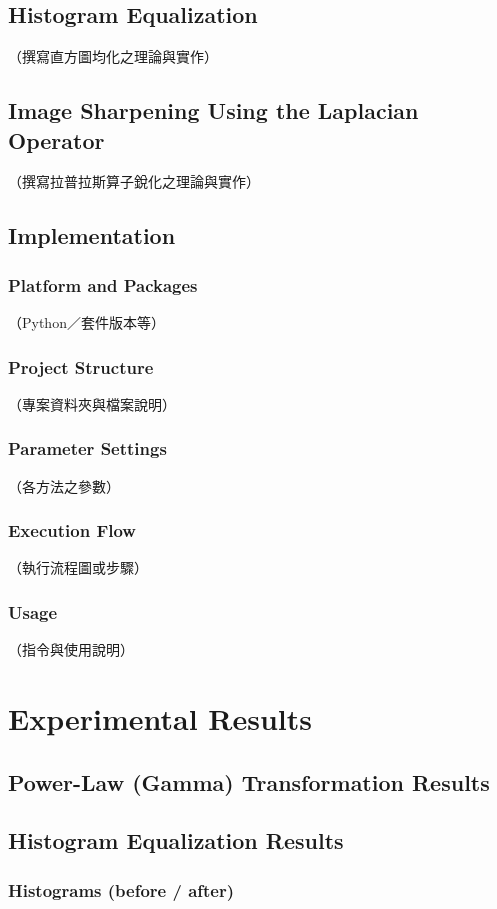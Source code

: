 \documentclass[12pt,a4paper]{article}
\begin{document}
\subsection{Histogram Equalization}
（撰寫直方圖均化之理論與實作）

\subsection{Image Sharpening Using the Laplacian Operator}
（撰寫拉普拉斯算子銳化之理論與實作）

\subsection{Implementation}
\subsubsection{Platform and Packages}
（Python／套件版本等）
\subsubsection{Project Structure}
（專案資料夾與檔案說明）
\subsubsection{Parameter Settings}
（各方法之參數）
\subsubsection{Execution Flow}
（執行流程圖或步驟）
\subsubsection{Usage}
（指令與使用說明）

\section{Experimental Results}
\subsection{Power-Law (Gamma) Transformation Results}
\subsection{Histogram Equalization Results}
\subsubsection{Histograms (before / after)}
\end{document}
